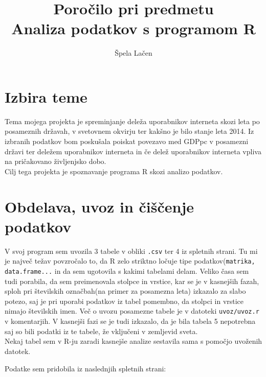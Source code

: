 \documentclass[11pt,a4paper]{article}
\begin{document}
\author{Špela Lačen}
\title{Poročilo pri predmetu \\
Analiza podatkov s programom R}
\maketitle

\section{Izbira teme}

Tema mojega projekta je spreminjanje deleža uporabnikov interneta skozi leta po posameznih državah, v svetovnem okvirju ter kakšno je bilo stanje leta 2014. Iz izbranih podatkov bom poskušala poiskat povezavo med  GDPpc v posamezni državi ter deležem uporabnikov interneta in če delež uporabnikov interneta vpliva na pričakovano življenjsko dobo.
\\ Cilj tega projekta je spoznavanje programa R skozi analizo podatkov.



\section{Obdelava, uvoz in čiščenje podatkov}

V svoj program sem uvozila 3 tabele  v obliki \verb|.csv| ter 4 iz spletnih strani. Tu mi je največ težav povzročalo to, da R zelo striktno ločuje tipe podatkov\-(\verb|matrika, data.frame...| in da sem ugotovila s kakimi tabelami delam. Veliko časa sem tudi porabila, da sem preimenovala stolpce in vrstice, kar se je v kasnejših fazah, sploh pri številskih označbah(na primer za posamezna leta) izkazalo za slabo potezo, saj je pri uporabi podatkov iz tabel pomembno, da stolpci in vrstice nimajo številskih imen. Več o uvozu posamezne tabele je v datoteki \verb|uvoz/uvoz.r| v komentarjih. V kasnejši fazi se je tudi izkazalo, da je bila tabela 5 nepotrebna saj so bili podatki iz te tabele, že vključeni v zemljevid sveta.
\\ Nekaj tabel sem v R-ju zaradi kasnejše analize sestavila sama s pomočjo uvoženih datotek.

Podatke sem pridobila iz naslednjih spletnih strani:
\end{document}
